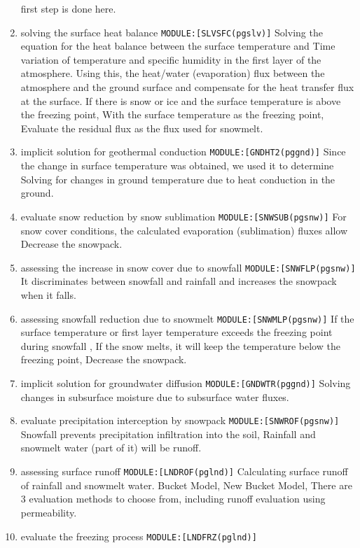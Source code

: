 \begin{enumerate}
  first step is done here.
\item
  solving the surface heat balance \texttt{MODULE:{[}SLVSFC(pgslv){]}}
  Solving the equation for the heat balance between the surface
  temperature and Time variation of temperature and specific humidity in
  the first layer of the atmosphere. Using this, the heat/water
  (evaporation) flux between the atmosphere and the ground surface and
  compensate for the heat transfer flux at the surface. If there is snow
  or ice and the surface temperature is above the freezing point, With
  the surface temperature as the freezing point, Evaluate the residual
  flux as the flux used for snowmelt.
\item
  implicit solution for geothermal conduction
  \texttt{MODULE:{[}GNDHT2(pggnd){]}} Since the change in surface
  temperature was obtained, we used it to determine Solving for changes
  in ground temperature due to heat conduction in the ground.
\item
  evaluate snow reduction by snow sublimation
  \texttt{MODULE:{[}SNWSUB(pgsnw){]}} For snow cover conditions, the
  calculated evaporation (sublimation) fluxes allow Decrease the
  snowpack.
\item
  assessing the increase in snow cover due to snowfall
  \texttt{MODULE:{[}SNWFLP(pgsnw){]}} It discriminates between snowfall
  and rainfall and increases the snowpack when it falls.
\item
  assessing snowfall reduction due to snowmelt
  \texttt{MODULE:{[}SNWMLP(pgsnw){]}} If the surface temperature or
  first layer temperature exceeds the freezing point during snowfall ,
  If the snow melts, it will keep the temperature below the freezing
  point, Decrease the snowpack.
\item
  implicit solution for groundwater diffusion
  \texttt{MODULE:{[}GNDWTR(pggnd){]}} Solving changes in subsurface
  moisture due to subsurface water fluxes.
\item
  evaluate precipitation interception by snowpack
  \texttt{MODULE:{[}SNWROF(pgsnw){]}} Snowfall prevents precipitation
  infiltration into the soil, Rainfall and snowmelt water (part of it)
  will be runoff.
\item
  assessing surface runoff \texttt{MODULE:{[}LNDROF(pglnd){]}}
  Calculating surface runoff of rainfall and snowmelt water. Bucket
  Model, New Bucket Model, There are 3 evaluation methods to choose
  from, including runoff evaluation using permeability.
\item
  evaluate the freezing process \texttt{MODULE:{[}LNDFRZ(pglnd){]}}

\end{enumerate}
